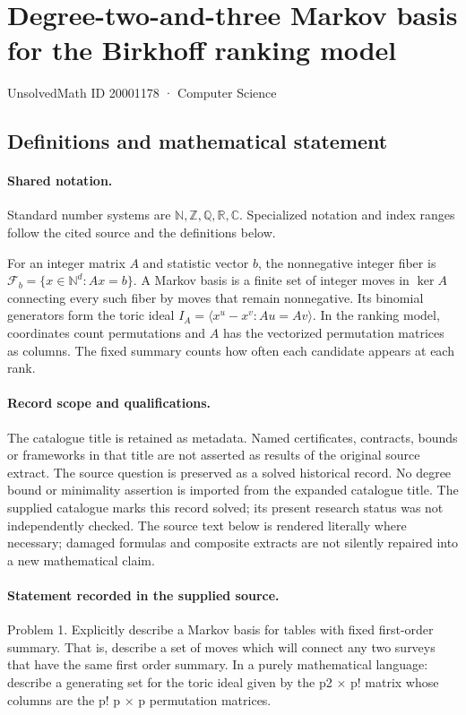 \documentclass[11pt]{article}
\begin{document}
\setcounter{section}{20001177}
\section{Degree-two-and-three Markov basis for the Birkhoff ranking model}\label{20001178}
{\small\sffamily UnsolvedMath ID 20001178 · Computer Science}
\subsection{Definitions and mathematical statement}

\paragraph{Shared notation.}Standard number systems are $\mathbb N,\mathbb Z,\mathbb Q,\mathbb R,\mathbb C$. Specialized notation and index ranges follow the cited source and the definitions below.


For an integer matrix $A$ and statistic vector $b$, the nonnegative integer fiber is $\mathcal F_b=\{x\in\mathbb N^d:Ax=b\}$. A Markov basis is a finite set of integer moves in $\ker A$ connecting every such fiber by moves that remain nonnegative. Its binomial generators form the toric ideal $I_A=\langle x^u-x^v:Au=Av\rangle$. In the ranking model, coordinates count permutations and $A$ has the vectorized permutation matrices as columns. The fixed summary counts how often each candidate appears at each rank.
\paragraph{Record scope and qualifications.}
The catalogue title is retained as metadata. Named certificates, contracts, bounds or frameworks in that title are not asserted as results of the original source extract.
The source question is preserved as a solved historical record. No degree bound or minimality assertion is imported from the expanded catalogue title. The supplied catalogue marks this record solved; its present research status was not independently checked.
The source text below is rendered literally where necessary; damaged formulas and composite extracts are not silently repaired into a new mathematical claim.
\paragraph{Statement recorded in the supplied source.}
Problem 1. Explicitly describe a Markov basis for tables with fixed first-order summary. That is, describe a set of moves which will connect any two surveys that have the same first order summary. In a purely mathematical language: describe a generating set for the toric ideal given by the p2 × p! matrix whose columns are the p! p × p permutation matrices.
\end{document}
